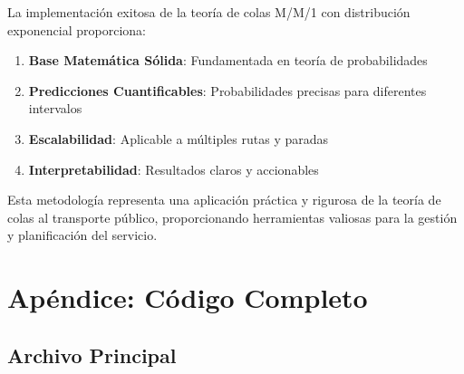 \documentclass[12pt,a4paper]{article}
\begin{document}
La implementación exitosa de la teoría de colas M/M/1 con distribución exponencial proporciona:

\begin{enumerate}
    \item \textbf{Base Matemática Sólida}: Fundamentada en teoría de probabilidades
    \item \textbf{Predicciones Cuantificables}: Probabilidades precisas para diferentes intervalos
    \item \textbf{Escalabilidad}: Aplicable a múltiples rutas y paradas
    \item \textbf{Interpretabilidad}: Resultados claros y accionables
\end{enumerate}

Esta metodología representa una aplicación práctica y rigurosa de la teoría de colas al transporte público, proporcionando herramientas valiosas para la gestión y planificación del servicio.

\section{Apéndice: Código Completo}

\subsection{Archivo Principal}
\end{document}
